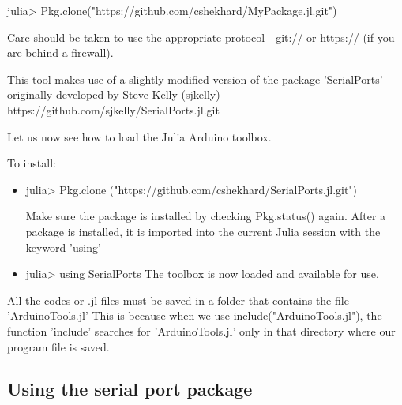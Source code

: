 julia> Pkg.clone("https://github.com/cshekhard/MyPackage.jl.git") 

Care should be taken to use the appropriate protocol - git:// or https:// (if you are behind a firewall). 

This tool makes use of a slightly modified version of the package 'SerialPorts' originally developed by Steve Kelly (sjkelly) - https://github.com/sjkelly/SerialPorts.jl.git 

Let us now see how to load the Julia Arduino toolbox. 


To install:
\begin {itemize}
\item julia> Pkg.clone ("https://github.com/cshekhard/SerialPorts.jl.git")

Make sure the package is installed by checking Pkg.status() again.
After a package is installed, it is imported into the current Julia session with the keyword 'using'

\item julia> using SerialPorts
The toolbox is now loaded and available for use. 

\end{itemize}

All the codes or .jl files must be saved in a folder that contains the file 'ArduinoTools.jl'
This is because when we use include("ArduinoTools.jl"), the function 'include' searches for 'ArduinoTools.jl' only in that directory where our program file is saved.




\subsection{Using the serial port package}

